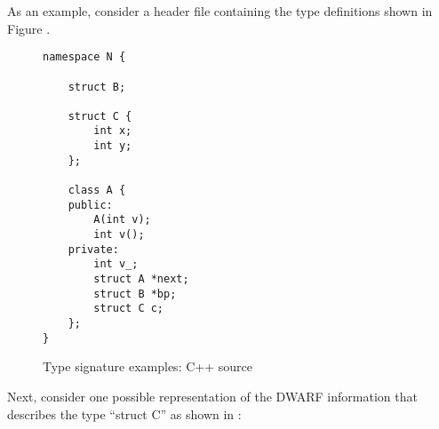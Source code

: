 As an example, 
consider a  header file 
containing the type definitions shown
in Figure .

\begin{figure}
\begin{lstlisting}
namespace N {

    struct B;

    struct C {
        int x;
        int y;
    };

    class A {
    public:
        A(int v);
        int v();
    private:
        int v_;
        struct A *next;
        struct B *bp;
        struct C c;
    };
}
\end{lstlisting}
\caption{Type signature examples: C++ source}
\label{fig:typesignatureexamplescsource}
\end{figure}

Next, consider one possible representation of the DWARF
information that describes the type “struct C” as shown
in 
:

